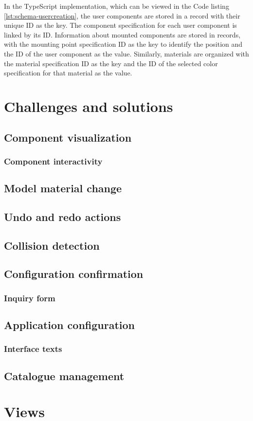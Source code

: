In the TypeScript implementation, which can be viewed in the Code listing \ref{lst:schema-usercreation}, the user components are stored in a record with their unique ID as the key. The component specification for each user component is linked by its ID. Information about mounted components are stored in records, with the mounting point specification ID as the key to identify the position and the ID of the user component as the value. Similarly, materials are organized with the material specification ID as the key and the ID of the selected color specification for that material as the value.


\section{Challenges and solutions}

\subsection{Component visualization}
\subsubsection{Component interactivity}

\subsection{Model material change}

\subsection{Undo and redo actions}

\subsection{Collision detection}

\subsection{Configuration confirmation}
\subsubsection{Inquiry form}

\subsection{Application configuration}
\subsubsection{Interface texts}

\subsection{Catalogue management}

\section{Views}
